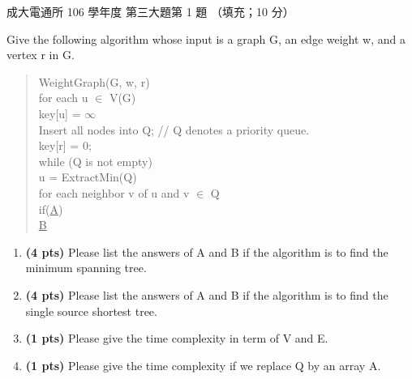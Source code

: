 \begin{pastexam}[label={px:ncku-106-cce-ds-08}]{成大電通所 106 學年度 第三大題第 1 題}
（填充；10 分）

Give the following algorithm whose input is a graph G, an edge weight w, and a vertex r in G.
\begin{quote}
WeightGraph(G, w, r)\\
\hspace*{1em}for each u $\in$ V(G)\\
\hspace*{2em}key[u] = $\infty$\\
\hspace*{1em}Insert all nodes into Q; \quad // Q denotes a priority queue.\\
\hspace*{1em}key[r] = 0;\\
\hspace*{1em}while (Q is not empty)\\
\hspace*{2em}u = ExtractMin(Q)\\
\hspace*{2em}for each neighbor v of u and v $\in$ Q\\
\hspace*{3em}if(\underline{\hspace{2em}A\hspace{2em}})\\
\hspace*{4em}\underline{\hspace{3em}B\hspace{3em}}
\end{quote}
\begin{enumerate}[label=\alph*.]
\item \textbf{(4 pts)} Please list the answers of A and B if the algorithm is to find the minimum
spanning tree.
\item \textbf{(4 pts)} Please list the answers of A and B if the algorithm is to find the single
source shortest tree.
\item \textbf{(1 pts)} Please give the time complexity in term of V and E.
\item \textbf{(1 pts)} Please give the time complexity if we replace Q by an array A.
\end{enumerate}
\end{pastexam}

